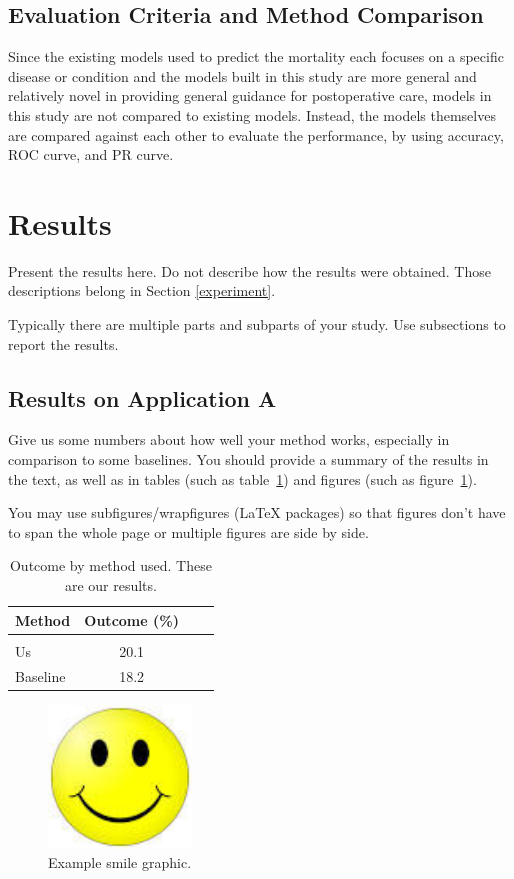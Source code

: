 \documentclass[twoside,11pt]{article}
\begin{document}
\subsection{Evaluation Criteria and Method Comparison}
Since the existing models used to predict the mortality each focuses on a specific disease or condition and the models built in this study are more general and relatively novel in providing general guidance for postoperative care, models in this study are not compared to existing models. Instead, the models themselves are compared against each other to evaluate the performance, by using accuracy, ROC curve, and PR curve.

\section{Results} \label{results}

Present the results here.
Do not describe how the results were obtained.
Those descriptions belong in Section \ref{experiment}.

Typically there are multiple parts and subparts of your study.
Use subsections to report the results.

\subsection{Results on Application A} 

Give us some numbers about how well your method works, especially in comparison to some baselines.
You should provide a summary of the results in the text, as well as in tables (such as table~\ref{tab:example}) and figures (such as figure~\ref{fig:example}).  

You may use subfigures/wrapfigures (LaTeX packages) so that figures don't have to span the whole page or multiple figures are side by side.

\begin{table}[htbp]
  \centering 
  \begin{tabular}{lclc} 
    Method & Outcome (\%) \\ 
    \hline \\[-11pt]
    Us & 20.1 \\ 
    Baseline & 18.2 \\ \hline 
  \end{tabular}
  \label{tab:example} 
    \caption{Outcome by method used. These are our results.} 
\end{table}

\begin{figure}[htbp]
  \centering 
  \includegraphics[width=1.5in]{smile.jpeg} 
  \caption{Example smile graphic.}
  \label{fig:example} 
\end{figure} 
\end{document}
